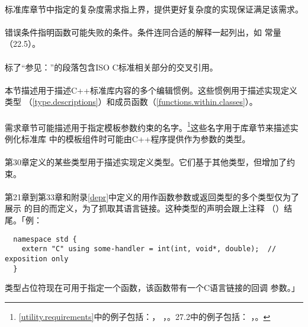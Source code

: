 \paragraph{}
标准库章节中指定的复杂度需求指上界，提供更好复杂度的实现保证满足该需求。

\paragraph{}
错误条件指明函数可能失败的条件。条件连同合适的解释一起列出，如
常量（22.5）。

\paragraph{}
标了“参见：”的段落包含ISO C标准相关部分的交叉引用。

\paragraph{}
本节描述用于描述C++标准库内容的多个编辑惯例。这些惯例用于描述实现定义类型
（\ref{type.descriptions}）和成员函数（\ref{functions.within.classes}）。

\paragraph{}
需求章节可能描述用于指定模板参数约束的名字。\footnote{
\ref{utility.requirements}中的例子包括：，
，。27.2中的例子包括：
，。}这些名字用于库章节来描述实例化标准库
中的模板组件时可能由C++程序提供作为参数的类型。

\paragraph{}
第30章定义的某些类型用于描述实现定义类型。它们基于其他类型，但增加了约束。

\paragraph{}
第21章到第33章和附录\ref{depr}中定义的用作函数参数或返回类型的多个类型仅为了展示
的目的而定义，为了抓取其语言链接。这种类型的声明会跟上注释
（）结尾。「例：
\begin{lstlisting}
  namespace std {
    extern "C" using some-handler = int(int, void*, double);  // exposition only
  }
\end{lstlisting}
类型占位符现在可用于指定一个函数，该函数带有一个C语言链接的回调
参数。」

